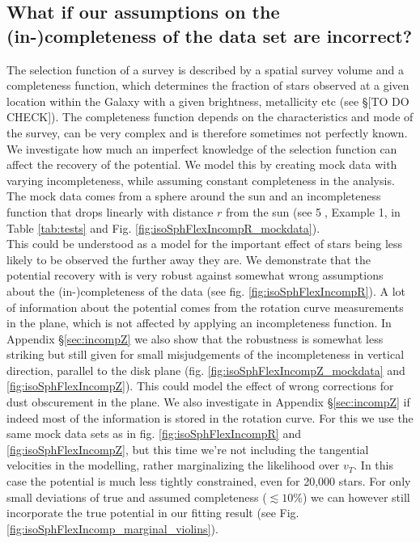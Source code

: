 \subsection{What if our assumptions on the (in-)completeness of the data set are incorrect?} \label{sec:results_incompR}

The selection function of a survey is described by a spatial survey volume and a completeness function, which determines the fraction of stars observed at a given location within the Galaxy with a given brightness, metallicity etc (see \S[TO DO CHECK]). The completeness function depends on the characteristics and mode of the survey, can be very complex and is therefore sometimes not perfectly known. We investigate how much an imperfect knowledge of the selection function can affect the recovery of the potential. We model this by creating mock data with varying incompleteness, while assuming constant completeness in the analysis. The mock data comes from a sphere around the sun and an incompleteness function that drops linearly with distance $r$ from the sun (see \textcircled{5}, Example 1, in Table \ref{tab:tests} and Fig. \ref{fig:isoSphFlexIncompR_mockdata}).
\\This could be understood as a model for the important effect of stars being less likely to be observed the further away they are. We demonstrate that the potential recovery with \RM is very robust against somewhat wrong assumptions about the (in-)completeness of the data (see fig. \ref{fig:isoSphFlexIncompR}). A lot of information about the potential comes from the rotation curve measurements in the plane, which is not affected by applying an incompleteness function. In Appendix \S\ref{sec:incompZ}  we also show that the robustness is somewhat less striking but still given for small misjudgements of the incompleteness in vertical direction, parallel to the disk plane (fig. \ref{fig:isoSphFlexIncompZ_mockdata} and \ref{fig:isoSphFlexIncompZ}). This could model the effect of wrong corrections for dust obscurement in the plane. We also investigate in Appendix \S\ref{sec:incompZ} if indeed most of the information is stored in the rotation curve. For this we use the same mock data sets as in fig. \ref{fig:isoSphFlexIncompR} and \ref{fig:isoSphFlexIncompZ}, but this time we’re not including the tangential velocities in the modelling, rather marginalizing the likelihood over $v_T$. In this case the potential is much less tightly constrained, even for 20,000 stars. For only small deviations of true and assumed completeness ($\lesssim 10\%$) we can however still incorporate the true potential in our fitting result (see Fig. \ref{fig:isoSphFlexIncomp_marginal_violins}). 



